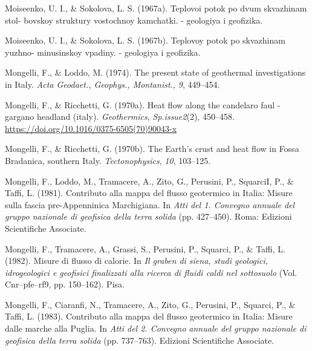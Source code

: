 \documentclass[draft,linenumbers]{agujournal2018}
\begin{document}
\leavevmode{}%
Moiseenko, U. I., \& Sokolova, L. S. (1967a). Teplovoi potok po dvum
skvazhinam stol- bovskoy struktury vostochnoy kamchatki. - geologiya i
geofizika.

\leavevmode{}%
Moiseenko, U. I., \& Sokolova, L. S. (1967b). Teplovoy potok po
skvazhinam yuzhno- minusinskoy vpadiny. - geologiya i geofizika.

\leavevmode{}%
Mongelli, F., \& Loddo, M. (1974). The present state of geothermal
investigations in {Italy}. \emph{Acta Geodaet., Geophys., Montanist.,}
\emph{9}, 449--454.

\leavevmode{}%
Mongelli, F., \& Ricchetti, G. (1970a). Heat flow along the candelaro
faul - gargano headland (italy). \emph{Geothermics},
\emph{Sp.issue2}(2), 450--458.
\url{https://doi.org/10.1016/0375-6505(70)90043-x}

\leavevmode{}%
Mongelli, F., \& Ricchetti, G. (1970b). The {Earth's} crust and heat
flow in {Fossa Bradanica, southern Italy}. \emph{Tectonophysics},
\emph{10}, 103--125.

\leavevmode{}%
Mongelli, F., Loddo, M., Tramacere, A., Zito, G., Perusini, P.,
SquarciI, P., \& Taffi, L. (1981). Contributo alla mappa del flusso
geotermico in {Italia}: Misure sulla fascia pre-{Appenninica
Marchigiana}. In \emph{Atti del 1. Convegno annuale del gruppo nazionale
di geofisica della terra solida} (pp. 427--450). Roma: Edizioni
Scientifiche Associate.

\leavevmode{}%
Mongelli, F., Tramacere, A., Grassi, S., Perusini, P., Squarci, P., \&
Taffi, L. (1982). Misure di flusso di calorie. In \emph{Il graben di
siena, studi geologici, idrogeologici e geofisici finalizzati alla
ricerca di fluidi caldi nel sottosuolo} (Vol. Cnr--pfe--rf9, pp.
150--162). Pisa.

\leavevmode{}%
Mongelli, F., Ciaranfi, N., Tramacere, A., Zito, G., Perusini, P.,
Squarci, P., \& Taffi, L. (1983). Contributo alla mappa del flusso
geotermico in {Italia}: Misure dalle marche alla {Puglia}. In \emph{Atti
del 2. Convegno annuale del gruppo nazionale di geofisica della terra
solida} (pp. 737--763). Edizioni Scientifiche Associate.
\end{document}
